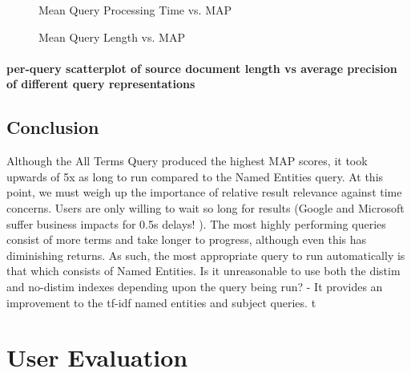 \documentclass{l4proj}
\begin{document}
\begin{figure}[h]
\caption{Mean Query Processing Time vs. MAP} \label{fig: timegraph}
\end{figure}
\bigskip
\begin{figure}[h!]
\caption{Mean Query Length vs. MAP} \label{fig: lengthgraph}
\end{figure}

\paragraph{per-query scatterplot of source document length vs average precision of different query representations}

\subsection{Conclusion} \label{conclusion}
Although the All Terms Query produced the highest MAP scores, it took upwards of 5x as long to run compared to the Named Entities query. At this point, we must weigh up the importance of relative result relevance against time concerns. Users are only willing to wait so long for results (Google and Microsoft suffer business impacts for 0.5s delays! \cite{performance}). The most highly performing queries consist of more terms and take longer to progress, although even this has diminishing returns.
As such, the most appropriate query to run automatically is that which consists of Named Entities.
Is it unreasonable to use both the distim and no-distim indexes depending upon the query being run? - It provides an improvement to the tf-idf named entities and subject queries.
t
\section{User Evaluation}
\end{document}
